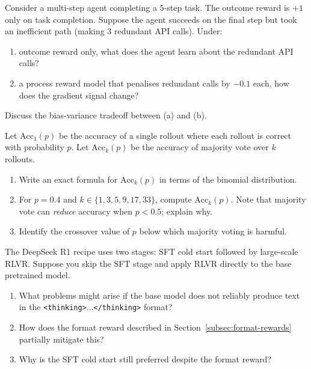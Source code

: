 \begin{exercise}
\label{ex:process-vs-outcome}
Consider a multi-step agent completing a 5-step task. The outcome
reward is $+1$ only on task completion. Suppose the agent succeeds on
the final step but took an inefficient path (making 3 redundant API
calls). Under:
\begin{enumerate}[label=(\alph*)]
\item outcome reward only, what does the agent learn about the
  redundant API calls?
\item a process reward model that penalises redundant calls by $-0.1$
  each, how does the gradient signal change?
\end{enumerate}
Discuss the bias-variance tradeoff between (a) and (b).
\end{exercise}

\begin{exercise}
\label{ex:inference-scaling}
Let $\text{Acc}_1(p)$ be the accuracy of a single rollout where
each rollout is correct with probability $p$. Let $\text{Acc}_k(p)$
be the accuracy of majority vote over $k$ rollouts.
\begin{enumerate}[label=(\alph*)]
\item Write an exact formula for $\text{Acc}_k(p)$ in terms of the
  binomial distribution.
\item For $p = 0.4$ and $k \in \{1, 3, 5, 9, 17, 33\}$, compute
  $\text{Acc}_k(p)$. Note that majority vote can \emph{reduce}
  accuracy when $p < 0.5$; explain why.
\item Identify the crossover value of $p$ below which majority voting
  is harmful.
\end{enumerate}
\end{exercise}

\begin{exercise}
\label{ex:deepseek-recipe}
The DeepSeek R1 recipe uses two stages: SFT cold start followed by
large-scale RLVR. Suppose you skip the SFT stage and apply RLVR
directly to the base pretrained model.
\begin{enumerate}[label=(\alph*)]
\item What problems might arise if the base model does not reliably
  produce text in the \texttt{<thinking>}...\texttt{</thinking>}
  format?
\item How does the format reward described in
  Section~\ref{subsec:format-rewards} partially mitigate this?
\item Why is the SFT cold start still preferred despite the format
  reward?
\end{enumerate}
\end{exercise}
